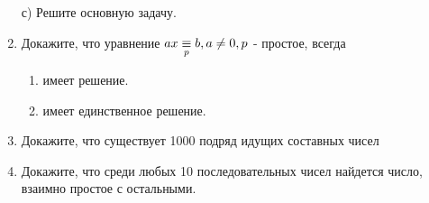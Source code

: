 \begin{enumerate}
с) Решите основную задачу.
\item Докажите, что уравнение $ax \underset{p}{\equiv} b, a \neq 0, p $ - простое, всегда 
\begin{enumerate}[noitemsep]
\item имеет решение.
\item имеет единственное решение.
\end{enumerate}
\hr
\item Докажите, что существует 1000 подряд идущих составных чисел
\item Докажите, что среди любых 10 последовательных чисел найдется число, взаимно простое с
остальными.
\end{enumerate}

